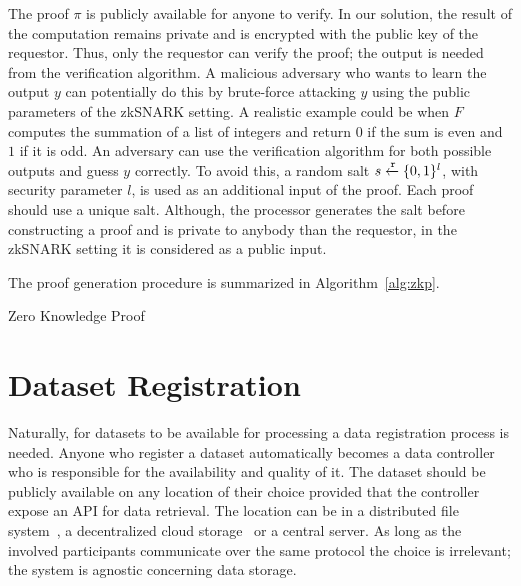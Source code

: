 The proof $\pi$ is publicly available for anyone to verify. In our solution, the result of the computation remains private and is encrypted with the public key of the requestor. Thus, only the requestor can verify the proof; the output is needed from the verification algorithm. A malicious adversary who wants to learn the output $y$ can potentially do this by brute-force attacking $y$ using the public parameters of the zkSNARK setting. A realistic example could be when $F$ computes the summation of a list of integers and return $0$ if the sum is even and $1$ if it is odd. An adversary can use the verification algorithm for both possible outputs and guess $y$ correctly. To avoid this, a random salt $s \xleftarrow{\mathtt{r}}{\{0, 1\}^{l}}$, with security parameter $l$, is used as an additional input of the proof. Each proof should use a unique salt. Although, the processor generates the salt before constructing a proof and is private to anybody than the requestor, in the zkSNARK setting it is considered as a public input.

The proof generation procedure is summarized in Algorithm~\ref{alg:zkp}.

\begin{algorithm}[!htb]
  \caption{Zero Knowledge Proof}\label{alg:zkp}
  \begin{algorithmic}[1]
     
     
    \State {} 
  \EndFunction
     
     
  \EndProcedure
  \end{algorithmic}
\end{algorithm}

\section{Dataset Registration}
\label{solution:flow:reg_data}

Naturally, for datasets to be available for processing a data registration process is needed. Anyone who register a dataset automatically becomes a data controller who is responsible for the availability and quality of it. The dataset should be publicly available on any location of their choice provided that the controller expose an API for data retrieval. The location can be in a distributed file system~\cite{ipfs}, a decentralized cloud storage~\cite{storj} or a central server. As long as the involved participants communicate over the same protocol the choice is irrelevant; the system is agnostic concerning data storage.

